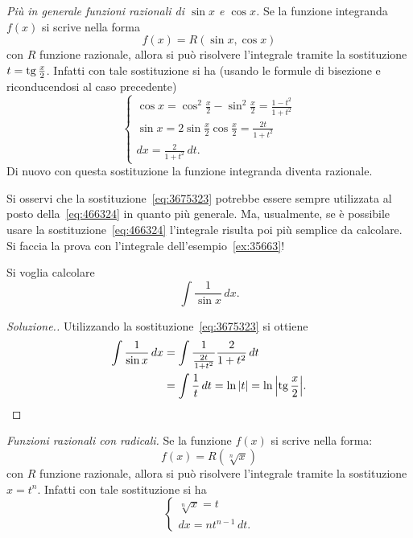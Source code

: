 \emph{Più in generale funzioni razionali di $\sin x$ e $\cos x$.}
Se la funzione integranda $f(x)$ si scrive nella forma
\[
  f(x) = R(\sin x, \cos x)
\]
con $R$ funzione razionale, allora si può risolvere l'integrale
tramite la sostituzione $t=\operatorname{tg} \frac{x}{2}$. Infatti con tale sostituzione si ha
(usando le formule di bisezione e riconducendosi al caso precedente)
\begin{equation}\label{eq:3675323}
  \begin{cases}
    \cos x = \cos^2 \frac x 2 - \sin^2 \frac x 2 = \frac{1-t^2}{1+t^2} \\
    \sin x = 2 \sin \frac x 2 \cos \frac x 2 = \frac{2t}{1+t^2}\\
    dx = \frac{2}{1+t^2}\, dt.
  \end{cases}
\end{equation}
Di nuovo con questa sostituzione la funzione integranda diventa razionale.

\begin{remark}
Si osservi che la sostituzione~\eqref{eq:3675323} potrebbe essere
sempre utilizzata al posto della~\eqref{eq:466324} in quanto più generale.
Ma, usualmente, se è possibile usare la sostituzione~\eqref{eq:466324}
l'integrale risulta
poi più semplice da calcolare. Si faccia la prova con l'integrale
dell'esempio~\ref{ex:35663}!
\end{remark}

\begin{example}
Si voglia calcolare
\[
 \int \frac{1}{\sin x}\, dx.
\]
\end{example}
\begin{proof}[Soluzione.]
Utilizzando la sostituzione~\eqref{eq:3675323}
si ottiene
\begin{align*}
  \int \frac{1}{\sin x}\, dx
  &= \int \frac{1}{\frac{2t}{1+t^2}}\frac{2}{1+t^2}\, dt \\
  &= \int \frac{1}{t}\, dt = \ln{\left|t\right|} = \ln {\left|\operatorname{tg}\frac x 2\right|}.
\end{align*}
\end{proof}

\emph{Funzioni razionali con radicali.}
Se la funzione $f(x)$ si scrive nella forma:
\[
  f(x) = R(\sqrt[n] x)
\]
con $R$ funzione razionale, allora si può risolvere l'integrale tramite
la sostituzione $x = t^n$. Infatti con tale sostituzione si ha
\begin{equation}\label{eq:4675821}
\begin{cases}
  \sqrt[n] x = t\\
  dx = n t^{n-1}\, dt.
\end{cases}
\end{equation}

